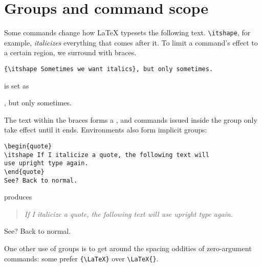 \section{Groups and command scope}
Some commands change how \LaTeX{} typesets the following text.
\verb|\itshape|, for example, \textit{italicizes} everything that comes after it.
To limit a command's effect to a certain region, we surround with braces.
\begin{leftfigure}
\begin{lstlisting}
{\itshape Sometimes we want italics}, but only sometimes.
\end{lstlisting}
\end{leftfigure}
is set as
\begin{leftfigure}
, but only sometimes.
\end{leftfigure}
The text within the braces forms a ,
and commands issued inside the group only take effect until it ends.
Environments also form implicit groups:
\begin{leftfigure}
\begin{lstlisting}
\begin{quote}
\itshape If I italicize a quote, the following text will
use upright type again.
\end{quote}
See? Back to normal.
\end{lstlisting}
\end{leftfigure}
produces
\begin{leftfigure}
\lm
\begin{quote}
\itshape If I italicize a quote, the following text will
use upright type again.
\end{quote}
See? Back to normal.
\end{leftfigure}
One other use of groups is to get around the spacing oddities of zero-argument
commands: some prefer \verb|{\LaTeX}| over \verb|\LaTeX{}|.
